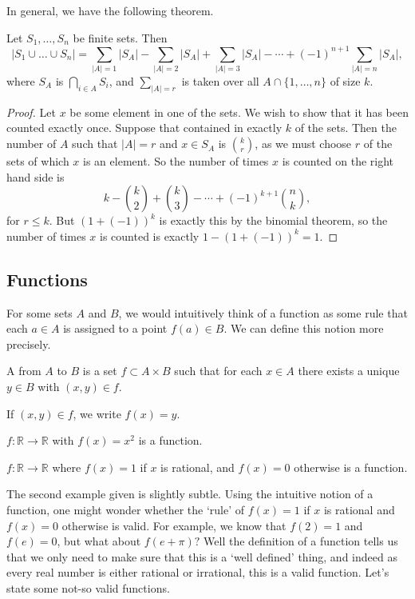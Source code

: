 \documentclass[a4paper]{scrartcl}
\begin{document}
In general, we have the following theorem.

\begin{theorem}
	Let $S_1, \dots, S_n$ be finite sets. Then
	$$
	|S_1 \cup \dots \cup S_n| = \sum_{|A| = 1} |S_A| - \sum_{|A| = 2} |S_A| + \sum_{|A| = 3} |S_A| - \cdots + (-1)^{n + 1} \sum_{|A| = n} |S_A|,
	$$
	where $S_A$ is $\bigcap_{i \in A} S_i$, and $\sum_{|A| = r}$ is taken over all $A \cap \{1, \dots, n\}$ of size $k$.
\end{theorem}
\begin{proof}
	Let $x$ be some element in one of the sets. We wish to show that it has been counted exactly once. Suppose that contained in exactly $k$ of the sets.
	Then the number of $A$ such that $|A| = r$ and $x \in S_A$ is $\binom{k}{r}$, as we must choose $r$ of the sets of which $x$ is an element.
	So the number of times $x$ is counted on the right hand side is
	$$
	k - \binom{k}{2} + \binom{k}{3} - \cdots + (-1)^{k + 1}\binom{n}{k},
	$$
	for $r \leq k$. But $(1 + (-1))^k$ is exactly this by the binomial theorem, so the number of times $x$ is counted is exactly $1 - (1 + (-1))^k = 1$.
\end{proof}

\subsection{Functions}

For some sets $A$ and $B$, we would intuitively think of a function as some rule that each $a \in A$ is assigned to a point $f(a) \in B$. We can define this notion more precisely.

\begin{definition}[Function]
	A  from $A$ to $B$ is a set $f \subset A \times B$ such that for each $x \in A$ there exists a unique $y \in B$ with $(x, y) \in f$.

	If $(x, y) \in f$, we write $f(x) = y$.
\end{definition}

\begin{example}
	$f: \mathbb{R} \rightarrow \mathbb{R}$ with $f(x) = x^2$ is a function.

	$f : \mathbb{R} \rightarrow \mathbb{R}$ where $f(x) = 1$ if $x$ is rational, and $f(x) = 0$ otherwise is a function.
\end{example}
The second example given is slightly subtle. Using the intuitive notion of a function, one might wonder whether the `rule' of $f(x) = 1$ if $x$ is rational and $f(x) = 0$ otherwise is valid. For example, we know that $f(2) = 1$ and $f(e) = 0$, but what about $f(e + \pi)?$ Well the definition of a function tells us that we only need to make sure that this is a `well defined' thing, and indeed as every real number is either rational or irrational, this is a valid function. Let's state some not-so valid functions.
\end{document}
